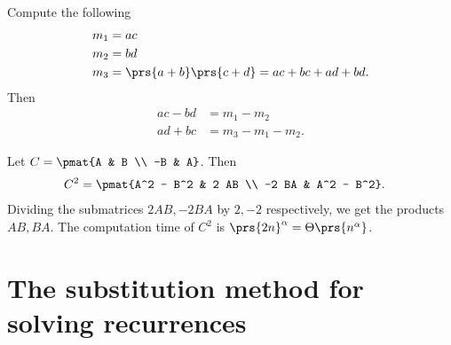 \documentclass[oneside]{scrbook}
\theoremstyle{definition}
\begin{document}
\begin{exercise}
\end{exercise}

\begin{exercise}
\end{exercise}

\begin{exercise}
\end{exercise}

\begin{exercise}
    Compute the following
    \begin{align*}
        m_1 &= ac \\
        m_2 &= bd \\
        m_3 &= \prs{a+b}\prs{c+d} = ac + bc + ad + bd \text{.}
    \end{align*}
    Then
    \begin{align*}
        ac - bd &= m_1 - m_2 \\
        ad + bc &= m_3 - m_1 - m_2 \text{.}
    \end{align*}
\end{exercise}

\begin{exercise}
    Let $C = \pmat{A & B \\ -B & A}$. Then
    \begin{align*}
        C^2 &= \pmat{A^2 - B^2 & 2 AB \\ -2 BA & A^2 - B^2} \text{.}
    \end{align*}
    Dividing the submatrices $2AB, -2BA$ by $2, -2$ respectively, we get the products $AB, BA$. The computation time of $C^2$ is $\prs{2n}^{\alpha} = \Theta\prs{n^{\alpha}}$.
\end{exercise}

\section{The substitution method for solving recurrences}
\end{document}
